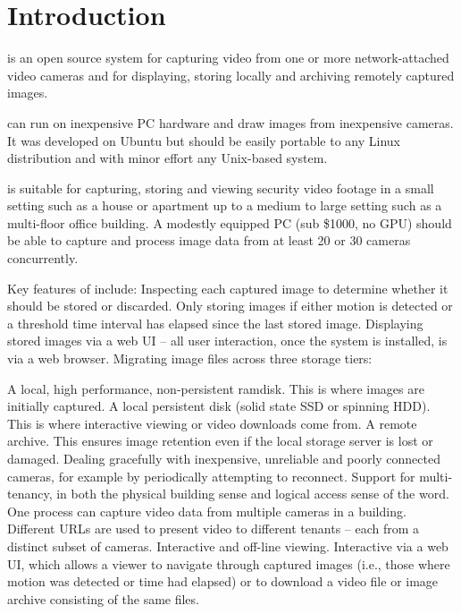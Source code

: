 \newcommand{\StorageTiers}%
  {
  \BI
  \I A local, high performance, non-persistent ramdisk.  This
     is where images are initially captured.
  \I A local persistent disk (solid state SSD or spinning HDD).
     This is where interactive viewing or video downloads come from.
  \I A remote archive.  This ensures image retention even if
     the local storage server is lost or damaged.
  \EI
  }

\section{Introduction}

  \PRODUCT{} is an open source system for capturing video from one or
  more network-attached video cameras and for displaying, storing locally
  and archiving remotely captured images.

  \PRODUCT{} can run on inexpensive PC hardware and draw images from
  inexpensive cameras.  It was developed on Ubuntu but should be easily
  portable to any Linux distribution and with minor effort any Unix-based
  system.

  \PRODUCT{} is suitable for capturing, storing and viewing security
  video footage in a small setting such as a house or apartment up
  to a medium to large setting such as a multi-floor office building.
  A modestly equipped PC (sub \$1000, no GPU) should be able to capture
  and process image data from at least 20 or 30 cameras concurrently.

  Key features of \PRODUCT{} include:
  \BE
  \I Inspecting each captured image to determine whether it should
     be stored or discarded.
  \I Only storing images if either motion is detected or a threshold
     time interval has elapsed since the last stored image.
  \I Displaying stored images via a web UI -- all user interaction,
     once the system is installed, is via a web browser.
  \I Migrating image files across three storage tiers:
     \StorageTiers{}
  \I Dealing gracefully with inexpensive, unreliable and poorly connected
     cameras, for example by periodically attempting to reconnect.
  \I Support for multi-tenancy, in both the physical building sense and
     logical access sense of the word.  One process can capture video
     data from multiple cameras in a building.  Different URLs are used
     to present video to different tenants -- each from a distinct subset
     of cameras.
  \I Interactive and off-line viewing.  Interactive via a web UI, which
     allows a viewer to navigate through captured images (i.e., those where
     motion was detected or time had elapsed) or to download a video file
     or image archive consisting of the same files.
  \EE
